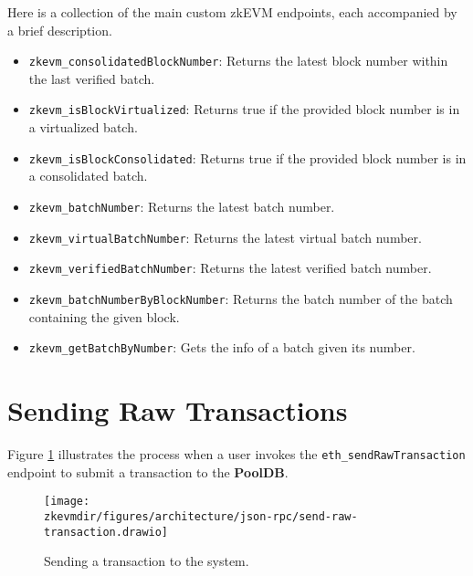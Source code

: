 Here is a collection of the main custom zkEVM endpoints, each accompanied by a brief description.

\begin{itemize}

\item \texttt{zkevm\_consolidatedBlockNumber}: Returns the latest block number within the last verified batch.

\item \texttt{zkevm\_isBlockVirtualized}: Returns true if the provided block number is in a virtualized batch.

\item \texttt{zkevm\_isBlockConsolidated}: Returns true if the provided block number is in a consolidated batch.

\item \texttt{zkevm\_batchNumber}: Returns the latest batch number.

\item \texttt{zkevm\_virtualBatchNumber}: Returns the latest virtual batch number.

\item \texttt{zkevm\_verifiedBatchNumber}: Returns the latest verified batch number.

\item \texttt{zkevm\_batchNumberByBlockNumber}: Returns the batch number of the batch containing the given block.

\item \texttt{zkevm\_getBatchByNumber}: Gets the info of a batch given its number.

\end{itemize}






\section{Sending Raw Transactions}
Figure \ref{fig:sendtrans} illustrates the process when a user invokes the \texttt{eth\_sendRawTransaction} endpoint to submit a transaction to the \textbf{PoolDB}.

\begin{figure}[H]
\centering
\texttt{[image: \\zkevmdir/figures/architecture/json-rpc/send-raw-transaction.drawio]}
\caption{Sending a transaction to the system.}
\label{fig:sendtrans}
\end{figure}


